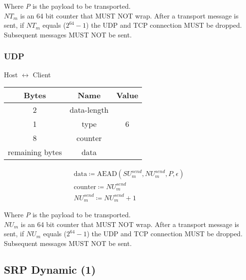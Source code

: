 Where \emph{P} is the payload to be transported.\\

$\mathit{NT}_{m}$ is an 64 bit counter that MUST NOT wrap. After a transport message is sent, if $\mathit{NT}_{m}$ equals
($2^{64}-1$) the UDP and TCP connection MUST be dropped. Subsequent messages MUST NOT be sent. \\

\subsubsection{UDP}

\begin{center}
    Host $\leftrightarrow$ Client\\
    \begin{tabular}{|c|c|c|}
        \hline
        \textbf{Bytes}  & \textbf{Name} & \textbf{Value} \\
        \hline
        2               & data-length   &                \\
        \hline
        1               & type          & 6              \\
        \hline
        8               & counter       &                \\
        \hline
        remaining bytes & data          &                \\
        \hline
    \end{tabular}
\end{center}

\begin{align*}
    & \text{data} \coloneqq \text{AEAD}(\mathit{SU}_{m}^{send},\mathit{NU}_{m}^{send}, P, \epsilon)\\
    & \text{counter} \coloneqq \mathit{NU}_{m}^{send}\\
    & \mathit{NU}_{m}^{send} \coloneqq \mathit{NU}_{m}^{send} + 1
\end{align*}


Where \emph{P} is the payload to be transported.\\

$\mathit{NU}_{m}$ is an 64 bit counter that MUST NOT wrap. After a transport message is sent, if $\mathit{NU}_{m}$ equals
($2^{64}-1$) the UDP and TCP connection MUST be dropped. Subsequent messages MUST NOT be sent. \\

\subsection{SRP Dynamic (1)}

